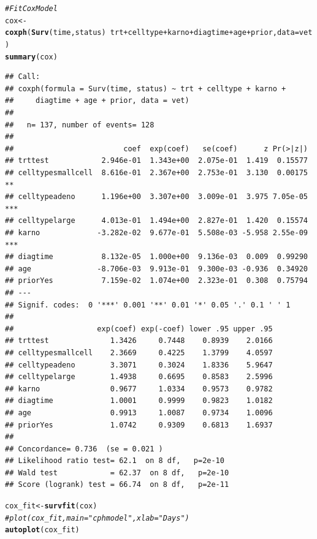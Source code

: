 \documentclass[a4paper, oneside]{book}\usepackage[]{graphicx}\usepackage[]{color}
\makeatletter
\newcommand{\hlcom}[1]{\textcolor[rgb]{0.678,0.584,0.686}{\textit{#1}}}%
\newcommand{\hlopt}[1]{\textcolor[rgb]{0,0,0}{#1}}%
\newcommand{\hlstd}[1]{\textcolor[rgb]{0.345,0.345,0.345}{#1}}%
\newcommand{\hlkwb}[1]{\textcolor[rgb]{0.69,0.353,0.396}{#1}}%
\newcommand{\hlkwc}[1]{\textcolor[rgb]{0.333,0.667,0.333}{#1}}%
\newcommand{\hlkwd}[1]{\textcolor[rgb]{0.737,0.353,0.396}{\textbf{#1}}}%
\newenvironment{kframe}{%
 \def\at@end@of@kframe{}%
 \ifinner\ifhmode%
  \def\at@end@of@kframe{\end{minipage}}%
  \begin{minipage}{\columnwidth}%
 \fi\fi%
 \def\FrameCommand##1{\hskip\@totalleftmargin \hskip-\fboxsep
 \colorbox{shadecolor}{##1}\hskip-\fboxsep
     \hskip-\linewidth \hskip-\@totalleftmargin \hskip\columnwidth}%
 \MakeFramed {\advance\hsize-\width
   \@totalleftmargin\z@ \linewidth\hsize
   \@setminipage}}%
 {\par\unskip\endMakeFramed%
 \at@end@of@kframe}
\newenvironment{knitrout}{}{} %
\makeatother
\begin{document}
\begin{knitrout}
\color{fgcolor}\begin{kframe}
\begin{alltt}
\hlcom{# Fit Cox Model}
\hlstd{cox} \hlkwb{<-} \hlkwd{coxph}\hlstd{(}\hlkwd{Surv}\hlstd{(time, status)} \hlopt{~} \hlstd{trt} \hlopt{+} \hlstd{celltype} \hlopt{+} \hlstd{karno}                   \hlopt{+} \hlstd{diagtime} \hlopt{+} \hlstd{age} \hlopt{+} \hlstd{prior ,} \hlkwc{data} \hlstd{= vet)}
\hlkwd{summary}\hlstd{(cox)}
\end{alltt}
\begin{verbatim}
## Call:
## coxph(formula = Surv(time, status) ~ trt + celltype + karno + 
##     diagtime + age + prior, data = vet)
## 
##   n= 137, number of events= 128 
## 
##                         coef  exp(coef)   se(coef)      z Pr(>|z|)    
## trttest            2.946e-01  1.343e+00  2.075e-01  1.419  0.15577    
## celltypesmallcell  8.616e-01  2.367e+00  2.753e-01  3.130  0.00175 ** 
## celltypeadeno      1.196e+00  3.307e+00  3.009e-01  3.975 7.05e-05 ***
## celltypelarge      4.013e-01  1.494e+00  2.827e-01  1.420  0.15574    
## karno             -3.282e-02  9.677e-01  5.508e-03 -5.958 2.55e-09 ***
## diagtime           8.132e-05  1.000e+00  9.136e-03  0.009  0.99290    
## age               -8.706e-03  9.913e-01  9.300e-03 -0.936  0.34920    
## priorYes           7.159e-02  1.074e+00  2.323e-01  0.308  0.75794    
## ---
## Signif. codes:  0 '***' 0.001 '**' 0.01 '*' 0.05 '.' 0.1 ' ' 1
## 
##                   exp(coef) exp(-coef) lower .95 upper .95
## trttest              1.3426     0.7448    0.8939    2.0166
## celltypesmallcell    2.3669     0.4225    1.3799    4.0597
## celltypeadeno        3.3071     0.3024    1.8336    5.9647
## celltypelarge        1.4938     0.6695    0.8583    2.5996
## karno                0.9677     1.0334    0.9573    0.9782
## diagtime             1.0001     0.9999    0.9823    1.0182
## age                  0.9913     1.0087    0.9734    1.0096
## priorYes             1.0742     0.9309    0.6813    1.6937
## 
## Concordance= 0.736  (se = 0.021 )
## Likelihood ratio test= 62.1  on 8 df,   p=2e-10
## Wald test            = 62.37  on 8 df,   p=2e-10
## Score (logrank) test = 66.74  on 8 df,   p=2e-11
\end{verbatim}
\begin{alltt}
\hlstd{cox_fit} \hlkwb{<-} \hlkwd{survfit}\hlstd{(cox)}
\hlcom{#plot(cox_fit, main = "cph model", xlab="Days")}
\hlkwd{autoplot}\hlstd{(cox_fit)}
\end{alltt}
\end{kframe}


\end{knitrout}
\end{document}

